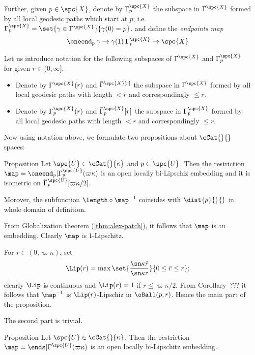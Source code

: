 Further, given  $p\in\spc{X}$,
denote by $\Gamma_p^\spc{X}$ the subspace in $\Gamma^\spc{X}$ formed by all local geodesic paths which start at $p$; 
i.e. 
$\Gamma^\spc{X}_p=\set{\gamma\in\Gamma^\spc{X}}{\gamma(0)=p}$.
and define the 
\emph{endpoints map}%
$$
\oneend_p\:\gamma\mapsto \gamma(1)\:\Gamma^\spc{X}_p\to\spc{X}
$$


Let us introduce notation for the following subspaces of $\Gamma^\spc{X}$ and $\Gamma^\spc{X}_p$
for given $r\in(0,\infty]$.

\begin{itemize}
\item Denote by $\Gamma^\spc{X}(r)$ 
and $\bar\Gamma^\spc{X}[r]$ 
the subspace in $\Gamma^\spc{X}$ formed by all local geodesic paths with length $<r$ and correspondingly $\le r$.

\item Denote by 
$\Gamma^\spc{X}_p(r)$ 
and 
$\bar\Gamma^\spc{X}_p[r]$
the subspace in $\Gamma^\spc{X}_p$ formed by all local geodesic paths with length $<r$ and correspondingly $\le r$.
\end{itemize}

Now using notation above, 
we formulate two propositions about $\cCat{}{}$ spaces:

\begin{thm}{Proposition}\label{lem:cat-geos3}
Let $\spc{U}\in\cCat{}{\kappa}$ and $p\in\spc{U}$.
Then the restriction
$\map=\oneend_p|\Gamma^\spc{U}_p(\varpi\kappa)$
is an open locally bi-Lipschiz embedding
and it is isometric on $\bar\Gamma^\spc{U}_p[\varpi\kappa/2]$.

Morover, the subfunction $\length\circ\map^{-1}$ coinsides with $\dist{p}{}{}$ in whole domain of definition. 
\end{thm}

From Globalization theorem (\ref{thm:alex-patch}), it follows that $\map$ is an embedding.
Clearly $\map$ is $1$-Lipschitz.

For $r\in(0,\varpi\kappa)$, 
set 
$$\Lip(r)
=
\max
\set{\frac{\sn\kappa\bar r}{\sn\kappa r}}{0\le\bar r\le r};$$ 
clearly $\Lip$ is continuous 
and $\Lip(r)=1$ if $r\le\varpi\kappa/2$.
From Corollary~??? it follows that $\map^{-1}$ is 
$\Lip(r)$-Lipschiz in $\oBall(p,r)$.
Hence the main part of the proposition.

The second part is trivial.
\qeds

\begin{thm}{Proposition}\label{lem:cat-geos2}
Let $\spc{U}\in\cCat{}{\kappa}$.
Then the restriction $\map=\ends|\Gamma^\spc{U}(\varpi\kappa)$
is an open locally bi-Lipschitz embedding.
\end{thm}

